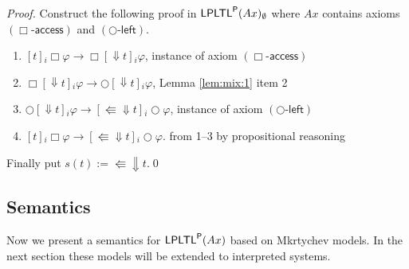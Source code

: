 \documentclass[envcountsect,envcountsame,oribibl,orivec]{llncs}
\newcommand{\limplies}{\rightarrow}
\newcommand{\lnext}{\bigcirc}
\newcommand{\lalways}{\Box}
\newcommand{\LPLTLp}{\textsf{LPLTL}^{\sf P}}
\newcommand{\jbox}[1]{\left[#1\right]\!}
\newcommand{\tprev}{\Lleftarrow}
\newcommand{\talwaysaccess}{\Downarrow}
\newcommand{\agent}{i}
\newcommand{\alwaysaccessprinciple}{\ensuremath{(\lalways\textsf{-access})}}
\newcommand{\nextleftshiftprinciple}{\ensuremath{(\lnext\textsf{-left})}}
\renewcommand{\phi}{\varphi}
\begin{document}
\begin{proof}
	Construct the following proof in $\LPLTLp(Ax)_\emptyset$ where $Ax$ contains axioms $\alwaysaccessprinciple$ and $\nextleftshiftprinciple$.
	\begin{enumerate}
		\item $\jbox{t}_\agent \lalways \phi \limplies \lalways \jbox{\talwaysaccess t}_\agent \phi$, \hfill instance of axiom \alwaysaccessprinciple
		
		\item $\lalways \jbox{\talwaysaccess t}_\agent \phi \limplies \lnext \jbox{\talwaysaccess t}_\agent \phi$, \hfill Lemma \ref{lem:mix:1} item 2
		
		\item $\lnext \jbox{\talwaysaccess t}_\agent \phi \limplies \jbox{\tprev \talwaysaccess t}_\agent \lnext \phi$, \hfill instance of axiom \nextleftshiftprinciple
		
		\item $\jbox{t}_\agent \lalways \phi \limplies \jbox{\tprev\talwaysaccess t}_\agent \lnext \phi$. \hfill from 1--3 by propositional reasoning
	\end{enumerate}
Finally put $s(t) := \tprev\talwaysaccess t$.\qed

\end{proof}

\subsection{Semantics}


Now we present a semantics for $\LPLTLp(Ax)$ based on Mkrtychev models. In the next section these models will be extended to interpreted systems.
\end{document}
